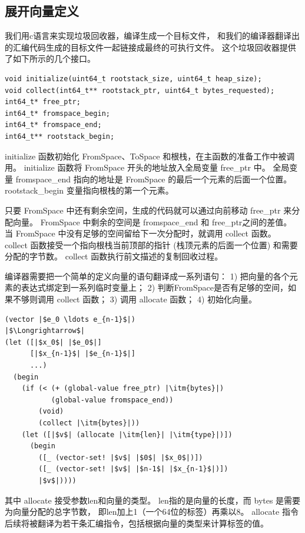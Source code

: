 \subsection{展开向量定义}

我们用c语言来实现垃圾回收器，编译生成一个目标文件，
和我们的编译器翻译出的汇编代码生成的目标文件一起链接成最终的可执行文件。
这个垃圾回收器提供了如下所示的几个接口。
\begin{lstlisting}
void initialize(uint64_t rootstack_size, uint64_t heap_size);
void collect(int64_t** rootstack_ptr, uint64_t bytes_requested);
int64_t* free_ptr;
int64_t* fromspace_begin;
int64_t* fromspace_end;
int64_t** rootstack_begin;
\end{lstlisting}

initialize 函数初始化 FromSpace、ToSpace 和根栈，在主函数的准备工作中被调用。
initialize 函数将 FromSpace 开头的地址放入全局变量 free\_ptr 中。
全局变量 fromspace\_end 指向的地址是 FromSpace 的最后一个元素的后面一个位置。
rootstack\_begin 变量指向根栈的第一个元素。

只要 FromSpace 中还有剩余空间，生成的代码就可以通过向前移动 free\_ptr 来分配向量。
FromSpace 中剩余的空间是 fromspace\_end 和 free\_ptr之间的差值。
当 FromSpace 中没有足够的空间留给下一次分配时，就调用 collect 函数。
collect 函数接受一个指向根栈当前顶部的指针 (栈顶元素的后面一个位置) 和需要分配的字节数。
collect 函数执行前文描述的复制回收过程。

编译器需要把一个简单的定义向量的语句翻译成一系列语句：
1) 把向量的各个元素的表达式绑定到一系列临时变量上；
2) 判断FromSpace是否有足够的空间，如果不够则调用 collect 函数；
3) 调用 allocate 函数；
4) 初始化向量。

\begin{lstlisting}
(vector |$e_0 \ldots e_{n-1}$|)
|$\Longrightarrow$|
(let ([|$x_0$| |$e_0$|]
      [|$x_{n-1}$| |$e_{n-1}$|]
      ...)
  (begin
    (if (< (+ (global-value free_ptr) |\itm{bytes}|)
           (global-value fromspace_end))
        (void)
        (collect |\itm{bytes}|))
    (let ([|$v$| (allocate |\itm{len}| |\itm{type}|)])
      (begin
        ([_ (vector-set! |$v$| |$0$| |$x_0$|)])
        ([_ (vector-set! |$v$| |$n-1$| |$x_{n-1}$|)])
        |$v$|))))
\end{lstlisting}

其中 allocate 接受参数len和向量的类型。
len指的是向量的长度，而 bytes 是需要为向量分配的总字节数，
即len加上1（一个64位的标签）再乘以8。
allocate 指令后续将被翻译为若干条汇编指令，包括根据向量的类型来计算标签的值。
